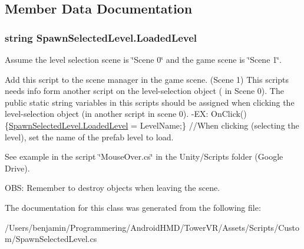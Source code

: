 \subsection{Member Data Documentation}
\subsubsection[{\texorpdfstring{Loaded\+Level}{LoadedLevel}}]{\setlength{\rightskip}{0pt plus 5cm}string Spawn\+Selected\+Level.\+Loaded\+Level\hspace{0.3cm}{\ttfamily [static]}}\hypertarget{class_spawn_selected_level_a8d218aa712c1464b1e6a928e52cdb56f}{}\label{class_spawn_selected_level_a8d218aa712c1464b1e6a928e52cdb56f}
Assume the level selection scene is \char`\"{}\+Scene 0\char`\"{} and the game scene is \char`\"{}\+Scene 1\char`\"{}.

Add this script to the scene manager in the game scene. (Scene 1) This scripts needs info form another script on the level-\/selection object ( in Scene 0). The public static string variables in this scripts should be assigned when clicking the level-\/selection object (in another script in scene 0). -\/\+EX\+: On\+Click()\{\hyperlink{class_spawn_selected_level_a8d218aa712c1464b1e6a928e52cdb56f}{Spawn\+Selected\+Level.\+Loaded\+Level} = Level\+Name;\} //\+When clicking (selecting the level), set the name of the prefab level to load.

See example in the script \char`\"{}\+Mouse\+Over.\+cs\char`\"{} in the Unity/\+Scripts folder (Google Drive).

O\+BS\+: Remember to destroy objects when leaving the scene. 

The documentation for this class was generated from the following file\+:\begin{DoxyCompactItemize}
\item 
/\+Users/benjamin/\+Programmering/\+Android\+H\+M\+D/\+Tower\+V\+R/\+Assets/\+Scripts/\+Custom/Spawn\+Selected\+Level.\+cs\end{DoxyCompactItemize}
